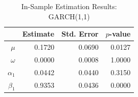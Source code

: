 \begin{table}[ht]
\centering
\begin{tabular}{rrrr}
  \hline
 & Estimate & Std. Error & $p$-value \\ 
  \hline
$\mu$ & 0.1720 & 0.0690 & 0.0127 \\ 
  $\omega$ & 0.0000 & 0.0008 & 1.0000 \\ 
  $\alpha_1$ & 0.0442 & 0.0440 & 0.3150 \\ 
  $\beta_1$ & 0.9353 & 0.0436 & 0.0000 \\ 
   \hline
\end{tabular}
\caption{In-Sample Estimation Results: GARCH(1,1)} 
\label{tab:garch}
\end{table}
